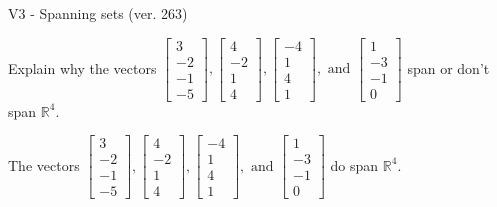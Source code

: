 \begin{exercise}
  \begin{exerciseTitle}V3 - Spanning sets (ver. 263)\end{exerciseTitle}
  \begin{exerciseStatement}
    Explain why the vectors \(\left[\begin{array}{r}
3 \\
-2 \\
-1 \\
-5
\end{array}\right] , \left[\begin{array}{r}
4 \\
-2 \\
1 \\
4
\end{array}\right] , \left[\begin{array}{r}
-4 \\
1 \\
4 \\
1
\end{array}\right] , \text{ and } \left[\begin{array}{r}
1 \\
-3 \\
-1 \\
0
\end{array}\right]\) span or don't span \(\mathbb{R}^4\). 
	


  \end{exerciseStatement}
  \begin{exerciseAnswer}
   The vectors \(\left[\begin{array}{r}
3 \\
-2 \\
-1 \\
-5
\end{array}\right] , \left[\begin{array}{r}
4 \\
-2 \\
1 \\
4
\end{array}\right] , \left[\begin{array}{r}
-4 \\
1 \\
4 \\
1
\end{array}\right] , \text{ and } \left[\begin{array}{r}
1 \\
-3 \\
-1 \\
0
\end{array}\right]\) 
  	 do  
	span \(\mathbb{R}^4\).
  


  \end{exerciseAnswer}
\end{exercise}